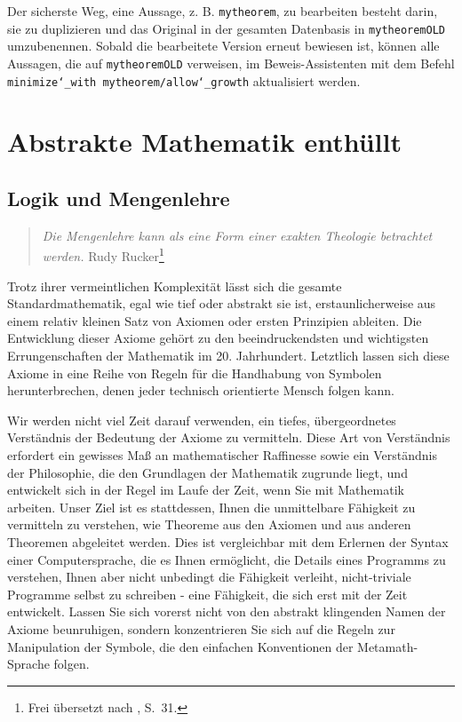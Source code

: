 Der sicherste Weg, eine Aussage, z. B. \texttt{mytheorem}, zu bearbeiten besteht darin, sie zu duplizieren und das Original in der gesamten Datenbasis in \texttt{mytheoremOLD} umzubenennen.
Sobald die bearbeitete Version erneut bewiesen ist, können alle Aussagen, die auf \texttt{mytheoremOLD} verweisen, im Beweis-Assistenten mit dem Befehl \texttt{minimize{\char`\_}with mytheorem/allow{\char`\_}growth} aktualisiert werden.

\chapter{Abstrakte Mathematik enthüllt}\label{fol}

\section{Logik und Mengenlehre}\label{logicandsettheory}

\begin{quote}
  {\em Die Mengenlehre kann als eine Form einer exakten Theologie betrachtet werden.}
  \flushright\sc  Rudy Rucker\footnote{Frei übersetzt nach \cite{Barrow}, S.~31.}\\
\end{quote}

Trotz ihrer vermeintlichen Komplexität lässt sich die gesamte Standardmathematik, egal wie tief oder abstrakt sie ist, erstaunlicherweise aus einem relativ kleinen Satz von Axiomen oder ersten Prinzipien ableiten. Die Entwicklung dieser Axiome gehört zu den beeindruckendsten und wichtigsten Errungenschaften der Mathematik im 20. Jahrhundert. Letztlich lassen sich diese Axiome in eine Reihe von Regeln für die Handhabung von Symbolen herunterbrechen, denen jeder technisch orientierte Mensch folgen kann.

Wir werden nicht viel Zeit darauf verwenden, ein tiefes, übergeordnetes Verständnis der Bedeutung der Axiome zu vermitteln. Diese Art von Verständnis erfordert ein gewisses Maß an mathematischer Raffinesse sowie ein Verständnis der Philosophie, die den Grundlagen der Mathematik zugrunde liegt, und entwickelt sich in der Regel im Laufe der Zeit, wenn Sie mit Mathematik arbeiten.  Unser Ziel ist es stattdessen, Ihnen die unmittelbare Fähigkeit zu vermitteln zu verstehen, wie Theoreme aus den Axiomen und aus anderen Theoremen abgeleitet werden.  Dies ist vergleichbar mit dem Erlernen der Syntax einer Computersprache, die es Ihnen ermöglicht, die Details eines Programms zu verstehen, Ihnen aber nicht unbedingt die Fähigkeit verleiht, nicht-triviale Programme selbst zu schreiben - eine Fähigkeit, die sich erst mit der Zeit entwickelt. Lassen Sie sich vorerst nicht von den abstrakt klingenden Namen der Axiome beunruhigen, sondern konzentrieren Sie sich auf die Regeln zur Manipulation der Symbole, die den einfachen Konventionen der Metamath-Sprache folgen.

